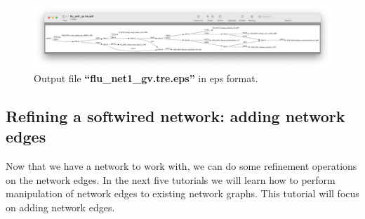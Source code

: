 \documentclass[11pt]{article}
\begin{document}
\begin{enumerate}
\begin{figure}[H]
\centering
\includegraphics[width=\textwidth]{eps1.png}
\caption{Output file \textbf{``flu\_net1\_gv.tre.eps''} in eps format.}
\label{eps1}
\end{figure}

\end{enumerate}
\subsection{Refining a softwired network: adding network edges}
\label{subsec:netadd}

Now that we have a network to work with, we can do some refinement operations 
on the network edges. In the next five tutorials we will learn how to perform 
manipulation of network edges to existing network graphs. This tutorial will 
focus on adding network edges.
\end{document}
